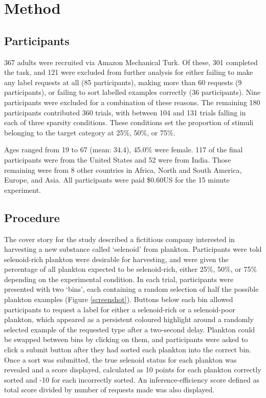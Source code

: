 \documentclass[10pt,letterpaper]{article}
\begin{document}
\section*{Method}

\subsection{Participants}

367 adults were recruited via Amazon Mechanical Turk.%
Of these, 301 completed the task, and 121 were excluded from further analysis for either failing to make any label requests at all (85 participants), making more than 60 requests (9 participants), or failing to sort labelled examples correctly (36 participants). Nine participants were excluded for a combination of these reasons.%
The remaining 180 participants contributed 360 trials, with between 104 and 131 trials falling in each of three sparsity conditions. These conditions set the proportion of stimuli belonging to the target category at 25\%, 50\%, or 75\%.

Ages ranged from 19 to 67 (mean: 34.4), 45.0\% were female. 117 of the final participants were from the United States and 52 were from India. Those remaining were from 8 other countries in Africa, North and South America, Europe, and Asia. All participants were paid \$0.60US for the 15 minute experiment.

\subsection{Procedure}

The cover story for the study described a fictitious company interested in harvesting a new substance called `selenoid' from plankton. Participants were told selenoid-rich plankton were desirable for harvesting, and were given the percentage of all plankton expected to be selenoid-rich, either 25\%, 50\%, or 75\% depending on the experimental condition. In each trial, participants were presented with two `bins', each containing a random selection of half the possible plankton examples (Figure \ref{screenshot}). Buttons below each bin allowed participants to request a label for either a selenoid-rich or a selenoid-poor plankton, which appeared as a persistent coloured highlight around a randomly selected example of the requested type after a two-second delay. Plankton could be swapped between bins by clicking on them, and participants were asked to click a \textsf{submit} button after they had sorted each plankton into the correct bin. Once a sort was submitted, the true selenoid status for each plankton was revealed and a score displayed, calculated as 10 points for each plankton correctly sorted and -10 for each incorrectly sorted. An inference-efficiency score defined as total score divided by number of requests made was also displayed. 
\end{document}

